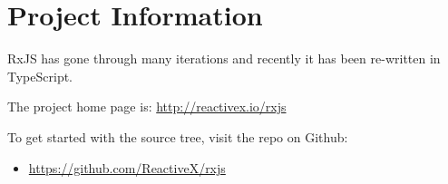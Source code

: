 \section{Project Information}

RxJS has gone through many iterations and recently it has been re-written in
TypeScript.

The project home page is:
\url{http://reactivex.io/rxjs}

To get started with the source tree, visit the repo on Github:

\begin{itemize}
  \item \url{https://github.com/ReactiveX/rxjs}
\end{itemize}
